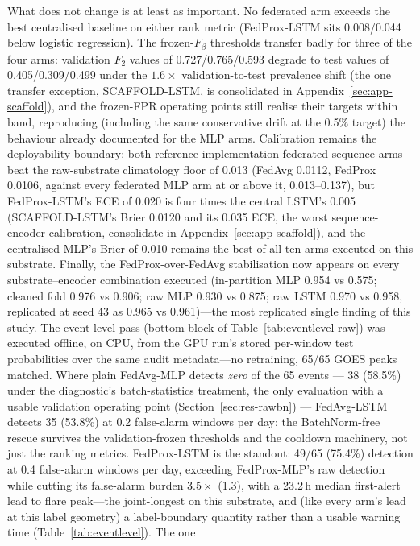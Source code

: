 What does not change is at least as important. No federated arm
exceeds the best centralised baseline on either rank metric
(FedProx-LSTM sits 0.008/0.044 below logistic regression). The
frozen-$F_\beta$ thresholds transfer badly for three of the four
arms: validation $F_2$ values of 0.727/0.765/0.593 degrade to test
values of 0.405/0.309/0.499 under the $1.6\times$ validation-to-test
prevalence shift (the one transfer exception, SCAFFOLD-LSTM, is
consolidated in Appendix~\ref{sec:app-scaffold}), and the
frozen-FPR operating
points still realise their targets within band, reproducing
(including the same conservative drift at the 0.5\% target) the
behaviour already documented for the MLP arms. Calibration remains
the deployability boundary: both reference-implementation federated
sequence arms beat
the raw-substrate climatology floor of 0.013 (FedAvg 0.0112,
FedProx 0.0106, against every federated MLP arm at
or above it, 0.013--0.137), but FedProx-LSTM's ECE of 0.020 is four
times the central LSTM's 0.005 (SCAFFOLD-LSTM's Brier 0.0120 and
its 0.035 ECE, the worst sequence-encoder calibration, consolidate
in Appendix~\ref{sec:app-scaffold}), and the centralised MLP's
Brier of 0.010 remains the best of all ten arms executed on this
substrate. Finally, the FedProx-over-FedAvg stabilisation now
appears on every substrate--encoder combination executed
(in-partition MLP 0.954 vs 0.575; cleaned fold 0.976 vs 0.906; raw
MLP 0.930 vs 0.875; raw LSTM 0.970 vs
0.958, replicated at seed 43 as 0.965 vs 0.961)---the most
replicated single finding of this study. The
event-level pass (bottom block of Table~\ref{tab:eventlevel-raw})
was executed offline, on CPU, from the GPU run's stored per-window
test probabilities over the same audit metadata---no retraining,
65/65 GOES peaks matched. Where plain FedAvg-MLP detects \emph{zero}
of the 65 events --- 38 (58.5\%) under the diagnostic's
batch-statistics treatment, the only evaluation with a usable
validation operating point (Section~\ref{sec:res-rawbn}) ---
FedAvg-LSTM detects 35 (53.8\%) at 0.2
false-alarm windows per day: the BatchNorm-free rescue survives the
validation-frozen thresholds and the cooldown machinery, not just
the ranking metrics. FedProx-LSTM is the standout: 49/65 (75.4\%)
detection at 0.4 false-alarm windows per day, exceeding
FedProx-MLP's raw detection while cutting its false-alarm burden
$3.5\times$ (1.3), with a 23.2\,h median first-alert lead to flare
peak---the joint-longest on this substrate, and (like every arm's
lead at this label geometry) a label-boundary quantity rather than a
usable warning time (Table~\ref{tab:eventlevel}). The one
